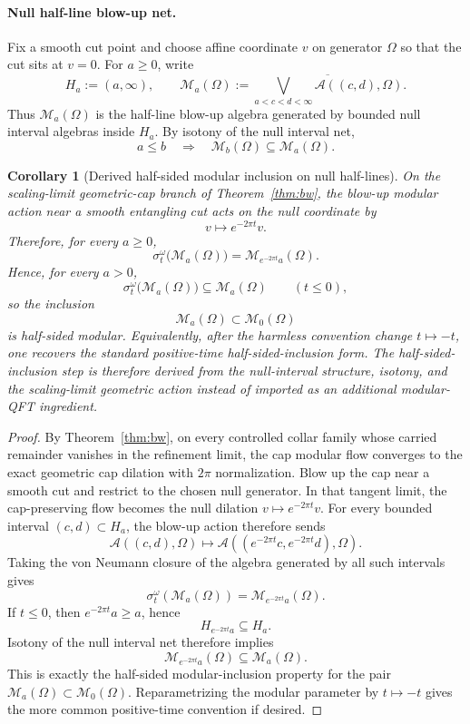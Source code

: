 \documentclass[11pt]{article}
\newtheorem{corollary}[theorem]{Corollary}
\begin{document}
\paragraph{Null half-line blow-up net.}
Fix a smooth cut point and choose affine coordinate \(v\) on generator \(\Omega\) so that the cut sits at \(v=0\). For \(a\ge 0\), write
\[
H_a:=(a,\infty),
\qquad
\mathcal M_a(\Omega)
:=
\overline{\bigvee_{a<c<d<\infty}\mathcal A((c,d),\Omega)}.
\]
Thus \(\mathcal M_a(\Omega)\) is the half-line blow-up algebra generated by bounded null interval algebras inside \(H_a\). By isotony of the null interval net,
\[
a\le b
\quad\Longrightarrow\quad
\mathcal M_b(\Omega)\subseteq \mathcal M_a(\Omega).
\]

\begin{corollary}[Derived half-sided modular inclusion on null half-lines]\label{cor:n2}
On the scaling-limit geometric-cap branch of Theorem~\ref{thm:bw}, the blow-up modular action near a smooth entangling cut acts on the null coordinate by
\[
v\mapsto e^{-2\pi t}v.
\]
Therefore, for every \(a\ge 0\),
\[
\sigma_t^\omega\bigl(\mathcal M_a(\Omega)\bigr)
=
\mathcal M_{e^{-2\pi t}a}(\Omega).
\]
Hence, for every \(a>0\),
\[
\sigma_t^\omega\bigl(\mathcal M_a(\Omega)\bigr)\subseteq \mathcal M_a(\Omega)
\qquad (t\le 0),
\]
so the inclusion
\[
\mathcal M_a(\Omega)\subset \mathcal M_0(\Omega)
\]
is half-sided modular. Equivalently, after the harmless convention change \(t\mapsto -t\), one recovers the standard positive-time half-sided-inclusion form. The half-sided-inclusion step is therefore derived from the null-interval structure, isotony, and the scaling-limit geometric action instead of imported as an additional modular-QFT ingredient.
\end{corollary}

\begin{proof}
By Theorem~\ref{thm:bw}, on every controlled collar family whose carried remainder vanishes in the refinement limit, the cap modular flow converges to the exact geometric cap dilation with \(2\pi\) normalization. Blow up the cap near a smooth cut and restrict to the chosen null generator. In that tangent limit, the cap-preserving flow becomes the null dilation \(v\mapsto e^{-2\pi t}v\). For every bounded interval \((c,d)\subset H_a\), the blow-up action therefore sends
\[
\mathcal A((c,d),\Omega)\longmapsto \mathcal A((e^{-2\pi t}c,e^{-2\pi t}d),\Omega).
\]
Taking the von Neumann closure of the algebra generated by all such intervals gives
\[
\sigma_t^\omega(\mathcal M_a(\Omega))
=
\mathcal M_{e^{-2\pi t}a}(\Omega).
\]
If \(t\le 0\), then \(e^{-2\pi t}a\ge a\), hence
\[
H_{e^{-2\pi t}a}\subseteq H_a.
\]
Isotony of the null interval net therefore implies
\[
\mathcal M_{e^{-2\pi t}a}(\Omega)\subseteq \mathcal M_a(\Omega).
\]
This is exactly the half-sided modular-inclusion property for the pair \(\mathcal M_a(\Omega)\subset \mathcal M_0(\Omega)\). Reparametrizing the modular parameter by \(t\mapsto -t\) gives the more common positive-time convention if desired.
\end{proof}
\end{document}
